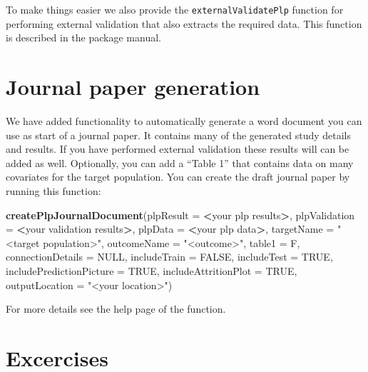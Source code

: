 \documentclass[]{book}
\newenvironment{Shaded}{\begin{snugshade}}{\end{snugshade}}
\newcommand{\KeywordTok}[1]{\textcolor[rgb]{0.13,0.29,0.53}{\textbf{#1}}}
\newcommand{\DataTypeTok}[1]{\textcolor[rgb]{0.13,0.29,0.53}{#1}}
\newcommand{\StringTok}[1]{\textcolor[rgb]{0.31,0.60,0.02}{#1}}
\newcommand{\OtherTok}[1]{\textcolor[rgb]{0.56,0.35,0.01}{#1}}
\newcommand{\OperatorTok}[1]{\textcolor[rgb]{0.81,0.36,0.00}{\textbf{#1}}}
\newcommand{\NormalTok}[1]{#1}
\begin{document}
To make things easier we also provide the \texttt{externalValidatePlp}
function for performing external validation that also extracts the
required data. This function is described in the package manual.

\section{Journal paper generation}\label{journal-paper-generation}

We have added functionality to automatically generate a word document
you can use as start of a journal paper. It contains many of the
generated study details and results. If you have performed external
validation these results will can be added as well. Optionally, you can
add a ``Table 1'' that contains data on many covariates for the target
population. You can create the draft journal paper by running this
function:

\begin{Shaded}
\begin{Highlighting}[]
 \KeywordTok{createPlpJournalDocument}\NormalTok{(}\DataTypeTok{plpResult =} \OperatorTok{<}\NormalTok{your plp results}\OperatorTok{>}\NormalTok{,}
                          \DataTypeTok{plpValidation =} \OperatorTok{<}\NormalTok{your validation results}\OperatorTok{>}\NormalTok{,}
                          \DataTypeTok{plpData =} \OperatorTok{<}\NormalTok{your plp data}\OperatorTok{>}\NormalTok{,}
                          \DataTypeTok{targetName =} \StringTok{"<target population>"}\NormalTok{,}
                          \DataTypeTok{outcomeName =} \StringTok{"<outcome>"}\NormalTok{,}
                          \DataTypeTok{table1 =}\NormalTok{ F,}
                          \DataTypeTok{connectionDetails =} \OtherTok{NULL}\NormalTok{,}
                          \DataTypeTok{includeTrain =} \OtherTok{FALSE}\NormalTok{,}
                          \DataTypeTok{includeTest =} \OtherTok{TRUE}\NormalTok{,}
                          \DataTypeTok{includePredictionPicture =} \OtherTok{TRUE}\NormalTok{,}
                          \DataTypeTok{includeAttritionPlot =} \OtherTok{TRUE}\NormalTok{,}
                          \DataTypeTok{outputLocation =} \StringTok{"<your location>"}\NormalTok{)}
\end{Highlighting}
\end{Shaded}

For more details see the help page of the function.

\section{Excercises}\label{excercises-1}
\end{document}
